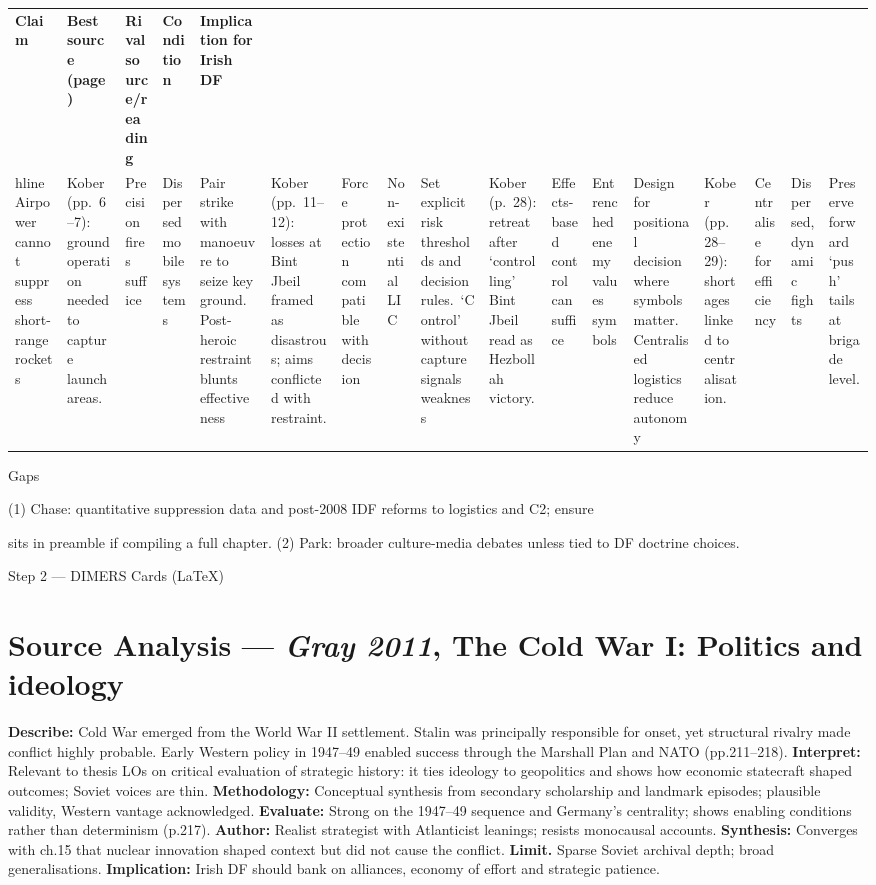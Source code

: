 \usepackage{array}
\begin{tabular}{p{3.2cm}p{4.2cm}p{3.6cm}p{3.2cm}p{4.2cm}}
	\textbf{Claim} & \textbf{Best source (page)} & \textbf{Rival source/reading} & \textbf{Condition} & \textbf{Implication for Irish DF}\\hline
	Airpower cannot suppress short-range rockets & Kober (pp.~6–7): ground operation needed to capture launch areas. & Precision fires suffice & Dispersed mobile systems & Pair strike with manoeuvre to seize key ground.\
	Post-heroic restraint blunts effectiveness & Kober (pp.~11–12): losses at Bint Jbeil framed as disastrous; aims conflicted with restraint. & Force protection compatible with decision & Non-existential LIC & Set explicit risk thresholds and decision rules.\
	‘Control’ without capture signals weakness & Kober (p.~28): retreat after ‘controlling’ Bint Jbeil read as Hezbollah victory. & Effects-based control can suffice & Entrenched enemy values symbols & Design for positional decision where symbols matter.\
	Centralised logistics reduce autonomy & Kober (pp.~28–29): shortages linked to centralisation. & Centralise for efficiency & Dispersed, dynamic fights & Preserve forward ‘push’ tails at brigade level.\
\end{tabular}

Gaps

(1) Chase: quantitative suppression data and post-2008 IDF reforms to logistics and C2; ensure \usepackage{array} sits in preamble if compiling a full chapter.
(2) Park: broader culture-media debates unless tied to DF doctrine choices.

\parencite{GRAY_2011_A,GRAY_2011_B,GRAY_2011_C}

Step 2 — DIMERS Cards (LaTeX)

\section*{Source Analysis — \textit{Gray 2011}, The Cold War I: Politics and ideology}
\textbf{Describe:} Cold War emerged from the World War II settlement. Stalin was principally responsible for onset, yet structural rivalry made conflict highly probable. Early Western policy in 1947–49 enabled success through the Marshall Plan and NATO (pp.211–218).
\textbf{Interpret:} Relevant to thesis LOs on critical evaluation of strategic history: it ties ideology to geopolitics and shows how economic statecraft shaped outcomes; Soviet voices are thin.
\textbf{Methodology:} Conceptual synthesis from secondary scholarship and landmark episodes; plausible validity, Western vantage acknowledged.
\textbf{Evaluate:} Strong on the 1947–49 sequence and Germany’s centrality; shows enabling conditions rather than determinism (p.217).
\textbf{Author:} Realist strategist with Atlanticist leanings; resists monocausal accounts.
\textbf{Synthesis:} Converges with ch.15 that nuclear innovation shaped context but did not cause the conflict.
\textbf{Limit.} Sparse Soviet archival depth; broad generalisations.
\textbf{Implication:} Irish DF should bank on alliances, economy of effort and strategic patience.

